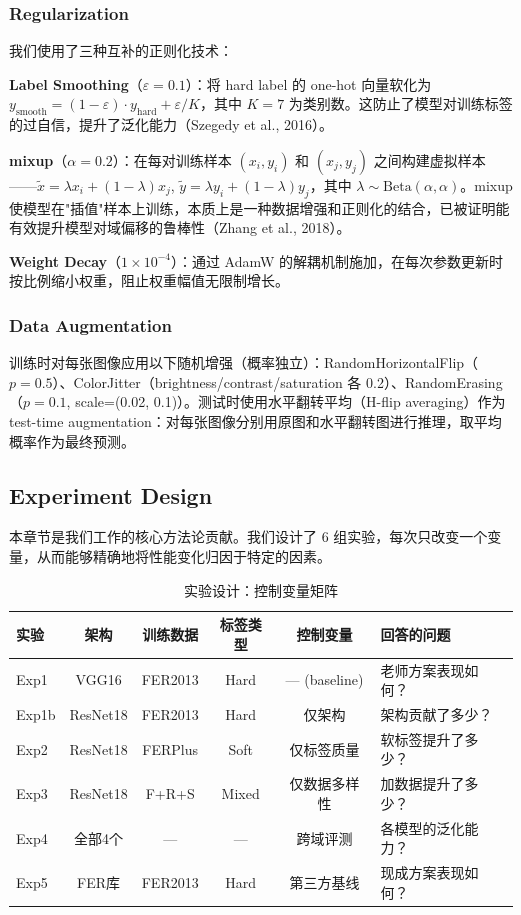 \documentclass[12pt,a4paper]{article}
\begin{document}
\subsubsection{Regularization}

我们使用了三种互补的正则化技术：

\textbf{Label Smoothing}（$\varepsilon=0.1$）：将 hard label 的 one-hot 向量软化为 $y_{\text{smooth}} = (1-\varepsilon) \cdot y_{\text{hard}} + \varepsilon/K$，其中 $K=7$ 为类别数。这防止了模型对训练标签的过自信，提升了泛化能力（Szegedy et al., 2016）。

\textbf{mixup}（$\alpha=0.2$）：在每对训练样本 $(x_i, y_i)$ 和 $(x_j, y_j)$ 之间构建虚拟样本——$\tilde{x} = \lambda x_i + (1-\lambda) x_j$, $\tilde{y} = \lambda y_i + (1-\lambda) y_j$，其中 $\lambda \sim \text{Beta}(\alpha, \alpha)$。mixup 使模型在"插值"样本上训练，本质上是一种数据增强和正则化的结合，已被证明能有效提升模型对域偏移的鲁棒性（Zhang et al., 2018）。

\textbf{Weight Decay}（$1\times10^{-4}$）：通过 AdamW 的解耦机制施加，在每次参数更新时按比例缩小权重，阻止权重幅值无限制增长。

\subsubsection{Data Augmentation}

训练时对每张图像应用以下随机增强（概率独立）：RandomHorizontalFlip（$p=0.5$）、ColorJitter（brightness/contrast/saturation 各 0.2）、RandomErasing（$p=0.1$, scale=(0.02, 0.1)）。测试时使用水平翻转平均（H-flip averaging）作为 test-time augmentation：对每张图像分别用原图和水平翻转图进行推理，取平均概率作为最终预测。

\subsection{Experiment Design}

本章节是我们工作的核心方法论贡献。我们设计了 6 组实验，每次只改变一个变量，从而能够精确地将性能变化归因于特定的因素。

\begin{table}[H]
\centering
\caption{实验设计：控制变量矩阵}
\begin{tabular}{lccccl}
\toprule
实验 & 架构 & 训练数据 & 标签类型 & 控制变量 & 回答的问题 \\
\midrule
Exp1  & VGG16    & FER2013    & Hard & — (baseline)    & 老师方案表现如何？\\
Exp1b & ResNet18 & FER2013    & Hard & 仅架构          & 架构贡献了多少？\\
Exp2  & ResNet18 & FERPlus    & Soft & 仅标签质量      & 软标签提升了多少？\\
Exp3  & ResNet18 & F+R+S      & Mixed& 仅数据多样性    & 加数据提升了多少？\\
Exp4  & 全部4个  & —          & —    & 跨域评测        & 各模型的泛化能力？\\
Exp5  & FER库    & FER2013    & Hard & 第三方基线      & 现成方案表现如何？\\
\bottomrule
\end{tabular}
\end{table}
\end{document}
